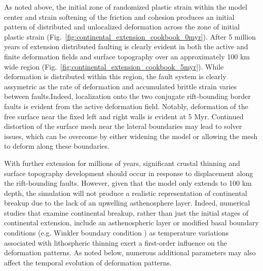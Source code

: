 As noted above, the initial zone of randomized plastic strain within the model center and strain softening of the friction and cohesion produces an initial pattern of distributed and unlocalized deformation across the zone of initial plastic strain (Fig.~\ref{fig:continental_extension_cookbook_0myr}). After 5 million years of extension distributed faulting is clearly evident in both the active and finite deformation fields and surface topography over an approximately 100 km wide region (Fig.~\ref{fig:continental_extension_cookbook_5myr}). While deformation is distributed within this region, the fault system is clearly assymetric as the rate of deformation and accumulated brittle strain varies between faults.Indeed, localization onto the two conjugate rift-bounding border faults is evident from the active deformation field. Notably, deformation of the free surface near the fixed left and right walls is evident at 5 Myr. Continued distortion of the surface mesh near the lateral boundaries may lead to solver issues, which can be overcome by either widening the model or allowing the mesh to deform along these boundaries.  

With further extension for millions of years, significant crustal thinning and surface topography development should occur in response to displacement along the rift-bounding faults. However, given that the model only extends to 100 km depth, the simulation will not produce a realistic representation of continental breakup due to the lack of an upwelling asthenosphere layer. Indeed, numerical studies that examine continental breakup, rather than just the initial stages of continental extension, include an asthenospheric layer or modified basal boundary conditions (e.g. Winkler boundary condition \cite[for example]{Bru14}) as temperature variations associated with lithospheric thinning exert a first-order influence on the deformation patterns. As noted below, numerous additional parameters may also affect the temporal evolution of deformation patterns.


